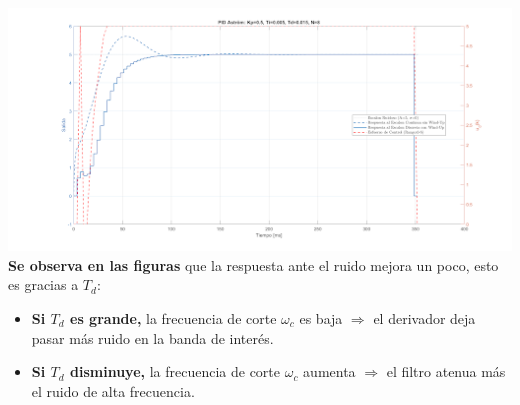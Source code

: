 \includegraphics[width=\columnwidth]{img/Astrom2.png}
\twocolumn
\textbf{Se observa en las figuras} que la respuesta ante el ruido mejora un poco, esto es gracias a $T_d$:

\begin{itemize}
	\item \textbf{Si $T_d$ es grande,} la frecuencia de corte $\omega_c$ es baja $\Rightarrow$ el derivador deja pasar más ruido en la banda de interés.
	\item \textbf{Si $T_d$ disminuye,} la frecuencia de corte $\omega_c$ aumenta $\Rightarrow$ el filtro atenua más el ruido de alta frecuencia.
\end{itemize}



